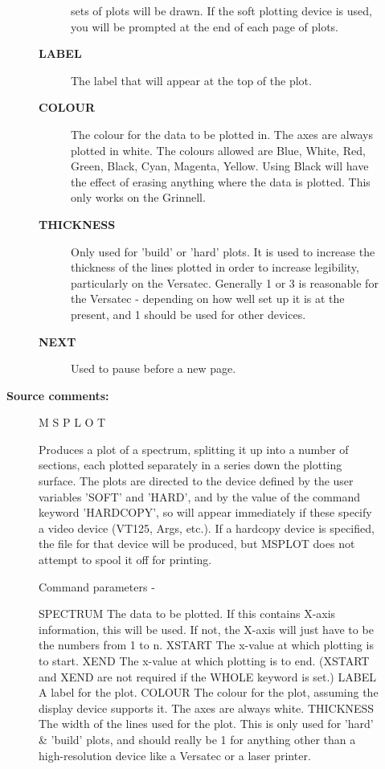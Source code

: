 \begin{description}
\begin{description}
\begin{description}
 sets of plots will be drawn.  If the soft plotting device is used,
 you will be prompted at the end of each page of plots.
\item [\textbf{LABEL}]
 The label that will appear at the top of the plot.
\item [\textbf{COLOUR}]
 The colour for the data to be plotted in.
 The axes are always plotted in white.  The colours allowed are Blue,
 White, Red, Green, Black, Cyan, Magenta, Yellow.  Using Black will
 have the effect of erasing anything where the data is plotted.  This
 only works on the Grinnell.
\item [\textbf{THICKNESS}]
 Only used for 'build' or 'hard' plots.  It is used to
 increase the thickness of the lines plotted in order to increase
 legibility, particularly on the Versatec.  Generally 1 or 3 is
 reasonable for the Versatec - depending on how well set up it is at
 the present, and 1 should be used for other devices.
\item [\textbf{NEXT}]
 Used to pause before a new page.
\end{description}

\item [\textbf{Source comments:}]
\begin{terminalv}
 M S P L O T

 Produces a plot of a spectrum, splitting it up into a number of
 sections, each plotted separately in a series down the plotting
 surface.  The plots are directed to the device defined by the
 user variables 'SOFT' and 'HARD', and by the value of the command
 keyword 'HARDCOPY', so will appear immediately if these specify a
 video device (VT125, Args, etc.).  If a hardcopy device is
 specified, the file for that device will be produced, but MSPLOT
 does not attempt to spool it off for printing.

 Command parameters -

 SPECTRUM    The data to be plotted.  If this contains X-axis
             information, this will be used.  If not, the X-axis
             will just have to be the numbers from 1 to n.
 XSTART      The x-value at which plotting is to start.
 XEND        The x-value at which plotting is to end.
             (XSTART and XEND are not required if the
             WHOLE keyword is set.)
 LABEL       A label for the plot.
 COLOUR      The colour for the plot, assuming the display device
             supports it.  The axes are always white.
 THICKNESS   The width of the lines used for the plot.  This is
             only used for 'hard' & 'build' plots, and should
             really be 1 for anything other than a high-resolution
             device like a Versatec or a laser printer.


\end{terminalv}
\end{description}
\end{description}
